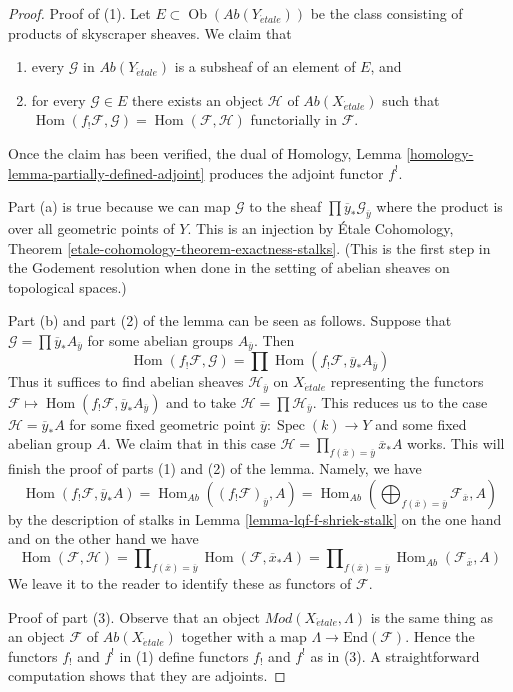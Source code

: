 \documentclass{stacks-project}
\theoremstyle{plain}
\theoremstyle{definition}
\theoremstyle{remark}
\numberwithin{equation}{subsection}
\def\Spec{\mathop{\mathrm{Spec}}}
\def\Hom{\mathop{\mathrm{Hom}}\nolimits}
\def\Ob{\mathop{\mathrm{Ob}}\nolimits}
\def\etale{{\acute{e}tale}}
\begin{document}
\begin{proof}
Proof of (1). Let $E \subset \Ob(\textit{Ab}(Y_\etale))$ be the class
consisting of products of skyscraper sheaves. We claim that
\begin{enumerate}
\item[(a)] every $\mathcal{G}$ in $\textit{Ab}(Y_\etale)$ is a subsheaf
of an element of $E$, and
\item[(b)] for every $\mathcal{G} \in E$ there exists an object
$\mathcal{H}$ of $\textit{Ab}(X_\etale)$ such that
$\Hom(f_!\mathcal{F}, \mathcal{G}) = \Hom(\mathcal{F}, \mathcal{H})$
functorially in $\mathcal{F}$.
\end{enumerate}
Once the claim has been verified, the dual of
Homology, Lemma \ref{homology-lemma-partially-defined-adjoint}
produces the adjoint functor $f^!$.

\medskip\noindent
Part (a) is true because we can map $\mathcal{G}$ to the sheaf
$\prod \overline{y}_*\mathcal{G}_{\overline{y}}$ where the
product is over all geometric points of $Y$. This is an injection by
\'Etale Cohomology, Theorem \ref{etale-cohomology-theorem-exactness-stalks}.
(This is the first step in the Godement resolution when
done in the setting of abelian sheaves on topological spaces.)

\medskip\noindent
Part (b) and part (2) of the lemma can be seen as follows.
Suppose that $\mathcal{G} = \prod \overline{y}_*A_{\overline{y}}$
for some abelian groups $A_{\overline{y}}$. Then
$$
\Hom(f_!\mathcal{F}, \mathcal{G}) =
\prod \Hom(f_!\mathcal{F}, \overline{y}_*A_{\overline{y}})
$$
Thus it suffices to find abelian sheaves $\mathcal{H}_{\overline{y}}$
on $X_\etale$ representing the functors
$\mathcal{F} \mapsto \Hom(f_!\mathcal{F}, \overline{y}_*A_{\overline{y}})$
and to take $\mathcal{H} = \prod \mathcal{H}_{\overline{y}}$.
This reduces us to the case $\mathcal{H} = \overline{y}_*A$
for some fixed geometric point $\overline{y} : \Spec(k) \to Y$
and some fixed abelian group $A$. We claim that in this case
$\mathcal{H} = \prod_{f(\overline{x}) = \overline{y}} \overline{x}_*A$ works.
This will finish the proof of parts (1) and (2) of the lemma.
Namely, we have
$$
\Hom(f_!\mathcal{F}, \overline{y}_*A) =
\Hom_{\textit{Ab}}((f_!\mathcal{F})_{\overline{y}}, A) =
\Hom_{\textit{Ab}}(\bigoplus\nolimits_{f(\overline{x}) = \overline{y}}
\mathcal{F}_{\overline{x}}, A)
$$
by the description of stalks in
Lemma \ref{lemma-lqf-f-shriek-stalk}
on the one hand and on the other hand we have
$$
\Hom(\mathcal{F}, \mathcal{H}) =
\prod\nolimits_{f(\overline{x}) = \overline{y}}
\Hom(\mathcal{F}, \overline{x}_*A) =
\prod\nolimits_{f(\overline{x}) = \overline{y}}
\Hom_{\textit{Ab}}(\mathcal{F}_{\overline{x}}, A)
$$
We leave it to the reader to identify these as functors of $\mathcal{F}$.

\medskip\noindent
Proof of part (3). Observe that an object $\textit{Mod}(X_\etale, \Lambda)$
is the same thing as an object $\mathcal{F}$ of $\textit{Ab}(X_\etale)$
together with a map $\Lambda \to \text{End}(\mathcal{F})$. Hence the
functors $f_!$ and $f^!$ in (1) define functors $f_!$ and $f^!$ as in (3).
A straightforward computation shows that they are adjoints.
\end{proof}
\end{document}
